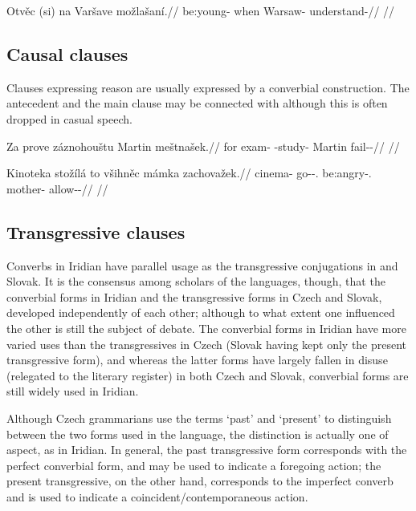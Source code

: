 \pex
\begingl
\gla Otvěc (si) na Varšave možlašaní.//
\glb be:young- when \Loc{} Warsaw-\Acc{} understand-//
\glft {}//
\endgl
\xe

\subsection{Causal clauses}

Clauses expressing reason are usually expressed by a converbial construction.
The antecedent and the main clause may be connected with 
although this is often dropped in casual speech.

\pex
\begingl
\gla Za prove záznohouštu Martin meštnašek.//
\glb for exam-\Acc{} \Neg{}-study- Martin fail-\Av{}-\Pf{}//
\glft {}//
\endgl
\xe


\pex
\begingl
\gla Kinoteka stožílá to všihněc mámka zachovažek.//
\glb cinema-\Acc{} go-\Av{}-\Sbj{}.\Ipf{} \Rz{} be:angry-\Cv{}.\Ipf{} mother-\Dim{} allow-\Av{}-\Pf{}//
\glft {}//
\endgl
\xe


\subsection{Transgressive clauses}

Converbs in Iridian have parallel usage as the
transgressive conjugations in 
and Slovak. It is the consensus among scholars of the languages,
though, that the converbial forms in Iridian and the transgressive forms in
Czech and Slovak, developed independently of each other; although to what extent
one influenced the other is still the subject of debate. The converbial forms in
Iridian have more varied uses than the transgressives in Czech (Slovak having
kept only the present transgressive form), and whereas the latter forms have
largely fallen in disuse (relegated to the literary register) in both Czech and
Slovak, converbial forms are still widely used in Iridian.

Although Czech grammarians use the terms `past' and `present' to distinguish
between the two forms used in the language, the distinction is actually one of
aspect, as in Iridian. In general, the past transgressive form
corresponds with the perfect converbial form, and may be used to indicate a
foregoing action; the present transgressive, on the other hand, corresponds to
the imperfect converb and is used to indicate a coincident/contemporaneous
action.

